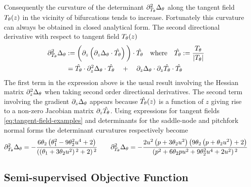 Consequently the curvature of the determinant $\partial_{T_{\theta}}^2\Delta_{\theta}$ along the tangent field $T_{\theta}(z)$ in the vicinity of bifurcations tends to increase. Fortunately this curvature can always be obtained in closed analytical form. The second directional derivative with respect to tangent field $T_{\theta}(z)$
\begin{align}
    \partial_{T_{\theta}}^2\Delta_{\theta} &:=
    \bigg(
        \partial_z\left(
            \partial_z\Delta_{\theta} \cdot \hat{T_{\theta}}
        \right)
    \bigg)\cdot \hat{T_{\theta}}\quad
    \mathrm{where} \quad \hat{T_{\theta}}:=\frac{T_{\theta}}{|T_{\theta}|}\\
    &=
    \hat{T_{\theta}}\cdot\partial_z^2\Delta_{\theta}\cdot\hat{T_{\theta}}
    \quad+\quad
    \partial_z\Delta_{\theta}\cdot\partial_z\hat{T_{\theta}}\cdot\hat{T_{\theta}}
\end{align}
The first term in the expression above is the usual result involving the Hessian matrix $\partial_z^2\Delta_{\theta}$ when taking second order directional derivatives. The second term involving the gradient $\partial_z\Delta_{\theta}$ appears because $\hat{T_{\theta}}(z)$ is a function of $z$ giving rise to a non-zero Jacobian matrix $\partial_z \hat{T_{\theta}}$. Using expressions for tangent fields \eqref{eq:tangent-field-examples} and determinants for the saddle-node and pitchfork normal forms the determinant curvatures respectively become
\begin{align}
    \partial_{T_{\theta}}^2\Delta_{\theta} =
    -\frac{6 \theta_2 \left(\theta _1^2-9 \theta _2^2 u^4+2\right)}
    {\left(\left(\theta _1+3 \theta _2 u^2\right){}^2+2\right){}^2}
    \qquad
    \partial_{T_{\theta}}^2\Delta_{\theta} =
    -\frac{2 u^2 \left(p+3 \theta _2 u^2\right) \left(9 \theta _2 \left(p+\theta _2 u^2\right)+2\right)}{\left(p^2+6 \theta _2 p u^2+9 \theta _2^2 u^4+2 u^2\right){}^2}
\end{align}
\subsection{Semi-supervised Objective Function}

